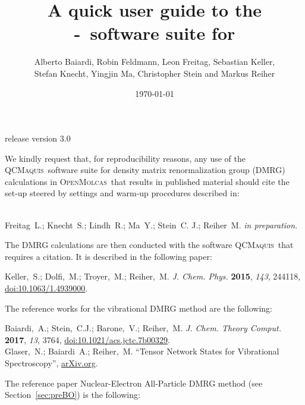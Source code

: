 \documentclass[bibliography=totoc,12pt,a4paper]{scrartcl}
\title{A quick user guide to the\\ \scine-\qcm\ software suite for \mol}
\author{Alberto Baiardi, Robin Feldmann, Leon Freitag, Sebastian Keller, \\ Stefan Knecht, Yingjin Ma, Christopher Stein and Markus Reiher}
\date{\today}
\newcommand{\relv}{release version 3.0}
\newcommand{\mol}{\textsc{OpenMolcas}}
\newcommand{\qcm}{\textsc{QCMaquis}}
\begin{document}


\maketitle
\thispagestyle{empty}
\begin{center}
\end{center}
\vspace{-1.85cm}
\centerline{\large{\relv}}

\vspace{2cm}

\noindent We kindly request that, for reproducibility reasons, any use of the \qcm\ software suite for density matrix renormalization group (DMRG) calculations in \mol\ that results in published material should cite the set-up steered by settings and warm-up procedures described in:

\begin{framed}
  \\
  \noindent Freitag~L.; Knecht~S.; Lindh~R.; Ma~Y.; Stein~C. J.; Reiher~M. \emph{in preparation}.
\end{framed}

\noindent The DMRG calculations are then conducted with the software \qcm\ that requires a citation.
It is described in the following paper:

\begin{framed}
\noindent Keller,~S.; Dolfi,~M.; Troyer,~M.; Reiher,~M. \emph{J. Chem. Phys.}
  \textbf{2015}, \emph{143}, 244118, \href{https://doi.org/10.1063/1.4939000}{doi:10.1063/1.4939000}.
\end{framed}

The reference works for the vibrational DMRG method are the following:

\begin{framed}
  \noindent Baiardi,~A.; Stein,~C.J.; Barone,~V.; Reiher,~M. \emph{J. Chem. Theory Comput.}
  \textbf{2017}, \emph{13}, 3764,   \href{https://doi.org/10.1021/acs.jctc.7b00329}{doi:10.1021/acs.jctc.7b00329}. \\
  \noindent Glaser,~N.; Baiardi~A.; Reiher,~M. ``Tensor Network States for Vibrational Spectroscopy'', \href{https://arxiv.org/abs/2109.08961}{arXiv.org}.
\end{framed}

The reference paper Nuclear-Electron All-Particle DMRG method (see Section~\ref{sec:preBO}) is the following:
\end{document}

